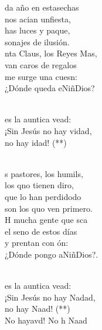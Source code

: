 \documentclass[12pt]{article}
\begin{document}
\begin{multicols*}{2}
\begin{cancion}%
	da año en estasechas\\
	nos acian unfiesta,\\
	has luces y paque,\\
	sonajes de ilusión.\\
	nta Claus, los Reyes Mas,\\
	van caros de regalos\\
\jump
	me surge una cuesn: \\
	¿Dónde queda eNiñDios? \\\jump\\
	\begin{chorus}%
	es la auntica vead:\\
	¡Sin Jesús no hay vidad, \\
	no hay idad! (**)\\
	\end{chorus}%
	\jump\\
	s pastores, los humils,\\
	los qno tienen diro,\\
	 que lo han perdidodo\\
	son los quo ven primero.\\
	H mucha gente que sca\\
	el seno de estos días\\
	y prentan con ón:\\
	¿Dónde pongo aNiñDios?. \\\jump\\
	\begin{chorus}%
	es la auntica vead:\\
	¡Sin Jesús no hay Nadad, \\
	no hay Naad! (**)\\
	No hayavd! No h Naad\\
	\end{chorus}%
	\jump\\
\end{cancion}%


\end{multicols*}
\end{document}
